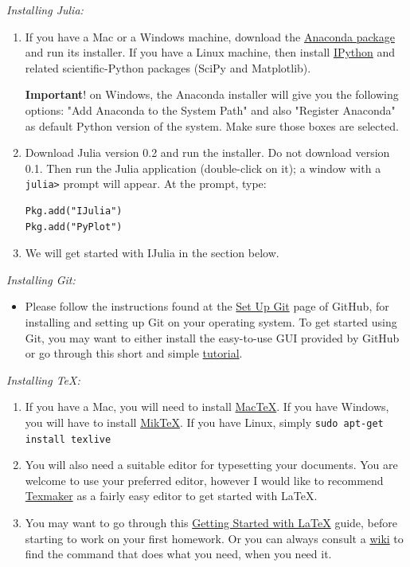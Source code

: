 \documentclass[11pt,a4paper,oneside]{report}
\begin{document}
{\it\large\color{red} Installing Julia:}
\begin{enumerate}
\item If you have a Mac or a Windows machine, download the \href{http://continuum.io/downloads}{Anaconda package} and run its installer. If you have a Linux machine, then install \href{http://ipython.org/install.html}{IPython} and related scientific-Python packages (SciPy and Matplotlib).

{\bf Important}! on Windows, the Anaconda installer will give you the following options: "Add Anaconda to the System Path" and also "Register Anaconda" as default Python version of the system. Make sure those boxes are selected.

\item Download Julia version 0.2 and run the installer. Do not download version 0.1. Then run the Julia application (double-click on it); a window with a \verb+julia>+ prompt will appear. At the prompt, type:

\begin{verbatim}
Pkg.add("IJulia")
Pkg.add("PyPlot")
\end{verbatim}

\item We will get started with IJulia in the section below.\\
\end{enumerate}

{\it\large\color{red} Installing Git:} 
\begin{itemize}
\item[] Please follow the instructions found at the  \href{https://help.github.com/articles/set-up-git}{Set Up Git} page of GitHub, for installing and setting up Git on your operating system. To get started using Git, you may want to either install the easy-to-use GUI provided by GitHub or go through this short and simple \href{http://rogerdudler.github.io/git-guide/}{tutorial}.\\
\end{itemize}

{\it\large\color{red} Installing \TeX :}
\begin{enumerate}
\item If you have a Mac, you will need to install \href{https://www.tug.org/mactex/}{MacTeX}. If you have Windows, you will have to install \href{http://www.miktex.org/download}{MikTeX}. If you have Linux, simply \verb+sudo apt-get install texlive+

\item You will also need a suitable editor for typesetting your documents. You are welcome to use your preferred editor, however I would like to recommend \href{http://www.xm1math.net/texmaker/download.html}{Texmaker} as a fairly easy editor to get started with \LaTeX.

\item You may want to go through this \href{http://www.maths.tcd.ie/~dwilkins/LaTeXPrimer/}{Getting Started with \LaTeX} guide, before starting to work on your first homework. Or you can always consult a \href{http://en.wikibooks.org/wiki/LaTeX/}{wiki} to find the command that does what you need, when you need it.\\
\end{enumerate}
\newpage
\end{document}
